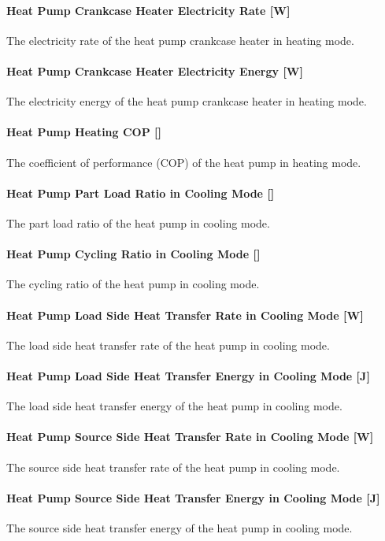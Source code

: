 \paragraph{Heat Pump Crankcase Heater Electricity Rate {[}W{]}} The electricity
rate of the heat pump crankcase heater in heating mode.
\paragraph{Heat Pump Crankcase Heater Electricity Energy {[}W{]}} The
electricity energy of the heat pump crankcase heater in heating mode.
\paragraph{Heat Pump Heating COP {[}{]}} The coefficient of performance (COP) of
the heat pump in heating mode.
\paragraph{Heat Pump Part Load Ratio in Cooling Mode {[}{]}} The part load ratio
of the heat pump in cooling mode.
\paragraph{Heat Pump Cycling Ratio in Cooling Mode {[}{]}} The cycling ratio of
the heat pump in cooling mode.
\paragraph{Heat Pump Load Side Heat Transfer Rate in Cooling Mode {[}W{]}} The
load side heat transfer rate of the heat pump in cooling mode.
\paragraph{Heat Pump Load Side Heat Transfer Energy in Cooling Mode {[}J{]}} The
load side heat transfer energy of the heat pump in cooling mode.
\paragraph{Heat Pump Source Side Heat Transfer Rate in Cooling Mode {[}W{]}} The
source side heat transfer rate of the heat pump in cooling mode.
\paragraph{Heat Pump Source Side Heat Transfer Energy in Cooling Mode {[}J{]}}
The source side heat transfer energy of the heat pump in cooling mode.
